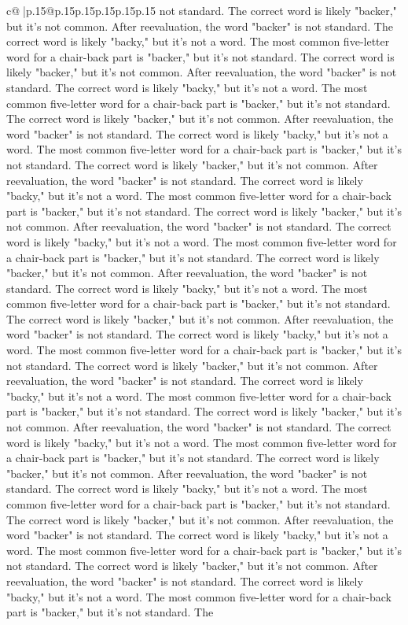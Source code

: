 \documentclass{article}
\begin{document}
{\begin{supertabular}{c@{$\;$}|p{.15\linewidth}@{}p{.15\linewidth}p{.15\linewidth}p{.15\linewidth}p{.15\linewidth}p{.15\linewidth}}
{{{not standard. The correct word is likely "backer," but it's not common. After reevaluation, the word "backer" is not standard. The correct word is likely "backy," but it's not a word. The most common five{-}letter word for a chair{-}back part is "backer," but it's not standard. The correct word is likely "backer," but it's not common. After reevaluation, the word "backer" is not standard. The correct word is likely "backy," but it's not a word. The most common five{-}letter word for a chair{-}back part is "backer," but it's not standard. The correct word is likely "backer," but it's not common. After reevaluation, the word "backer" is not standard. The correct word is likely "backy," but it's not a word. The most common five{-}letter word for a chair{-}back part is "backer," but it's not standard. The correct word is likely "backer," but it's not common. After reevaluation, the word "backer" is not standard. The correct word is likely "backy," but it's not a word. The most common five{-}letter word for a chair{-}back part is "backer," but it's not standard. The correct word is likely "backer," but it's not common. After reevaluation, the word "backer" is not standard. The correct word is likely "backy," but it's not a word. The most common five{-}letter word for a chair{-}back part is "backer," but it's not standard. The correct word is likely "backer," but it's not common. After reevaluation, the word "backer" is not standard. The correct word is likely "backy," but it's not a word. The most common five{-}letter word for a chair{-}back part is "backer," but it's not standard. The correct word is likely "backer," but it's not common. After reevaluation, the word "backer" is not standard. The correct word is likely "backy," but it's not a word. The most common five{-}letter word for a chair{-}back part is "backer," but it's not standard. The correct word is likely "backer," but it's not common. After reevaluation, the word "backer" is not standard. The correct word is likely "backy," but it's not a word. The most common five{-}letter word for a chair{-}back part is "backer," but it's not standard. The correct word is likely "backer," but it's not common. After reevaluation, the word "backer" is not standard. The correct word is likely "backy," but it's not a word. The most common five{-}letter word for a chair{-}back part is "backer," but it's not standard. The correct word is likely "backer," but it's not common. After reevaluation, the word "backer" is not standard. The correct word is likely "backy," but it's not a word. The most common five{-}letter word for a chair{-}back part is "backer," but it's not standard. The correct word is likely "backer," but it's not common. After reevaluation, the word "backer" is not standard. The correct word is likely "backy," but it's not a word. The most common five{-}letter word for a chair{-}back part is "backer," but it's not standard. The correct word is likely "backer," but it's not common. After reevaluation, the word "backer" is not standard. The correct word is likely "backy," but it's not a word. The most common five{-}letter word for a chair{-}back part is "backer," but it's not standard. The }}}
\end{supertabular}}
\end{document}
